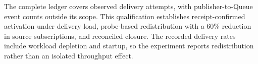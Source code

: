 The complete ledger covers observed delivery attempts, with publisher-to-Queue
event counts outside its scope. This qualification establishes
receipt-confirmed activation under delivery load, probe-based redistribution
with a 60\% reduction in source subscriptions, and reconciled closure. The
recorded delivery rates include workload depletion and startup, so the
experiment reports redistribution rather than an isolated throughput effect.

